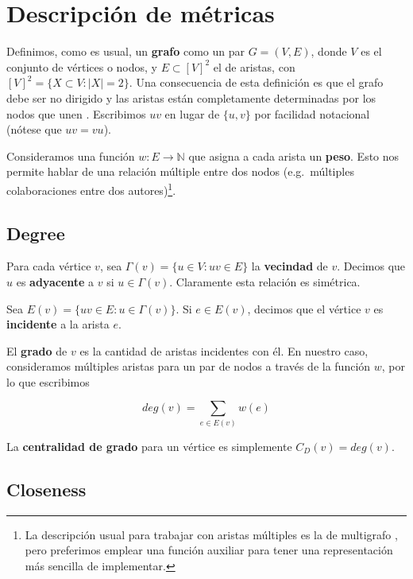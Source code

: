 \documentclass[journal]{IEEEtran}
\begin{document}
\section{Descripción de métricas} \label{sec:metricas}

Definimos, como es usual, un \textbf{grafo} como un par \(G = (V, E)\), donde \(V\) es el conjunto de vértices o nodos, y \(E \subset [V]^2 \) el de aristas, con \([V]^2 = \{ X \subset V : |X| = 2 \}\). Una consecuencia de esta definición es que el grafo debe ser no dirigido y las aristas están completamente determinadas por los nodos que unen \cite{diestel}. Escribimos \(uv\) en lugar de \(\{u, v\}\) por facilidad notacional (nótese que \(uv = vu\)).

Consideramos una función \(w: E \rightarrow \mathbb{N} \) que asigna a cada arista un \textbf{peso}. Esto nos permite hablar de una relación múltiple entre dos nodos (e.g.\ múltiples colaboraciones entre dos autores)\footnote{La descripción usual para trabajar con aristas múltiples es la de multigrafo \cite{diestel}, pero preferimos emplear una función auxiliar para tener una representación más sencilla de implementar. }. 

\subsection{Degree}

Para cada vértice \(v\), sea \(\Gamma(v) = \{u \in V : uv \in E \}\) la \textbf{vecindad} de \(v\). Decimos que \(u\) es \textbf{adyacente} a \(v\) si \(u \in \Gamma(v)\). Claramente esta relación es simétrica.

Sea \(E(v) = \{uv \in E : u \in \Gamma(v) \}\). Si \(e \in E(v)\), decimos que el vértice \(v\) es \textbf{incidente} a la arista \(e\).

El \textbf{grado} de \(v\) es la cantidad de aristas incidentes con él. En nuestro caso, consideramos múltiples aristas para un par de nodos a través de la función \(w\), por lo que escribimos \cite{bollobas}

\begin{equation}
	deg(v) = \sum_{e \in E(v)} w(e)
\end{equation}

La \textbf{centralidad de grado} para un vértice es simplemente \(C_D (v) = deg(v)\).

\subsection{Closeness}
\end{document}
